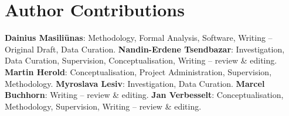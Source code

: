\documentclass[review,authoryear,3p]{elsarticle}
\begin{document}
\section*{Author Contributions}
\textbf{Dainius Masiliūnas}: Methodology, Formal Analysis, Software, Writing – Original Draft, Data Curation. \textbf{Nandin-Erdene Tsendbazar}: Investigation, Data Curation, Supervision, Conceptualisation, Writing – review \& editing. \textbf{Martin Herold}: Conceptualisation, Project Administration, Supervision, Methodology. \textbf{Myroslava Lesiv}: Investigation, Data Curation. \textbf{Marcel Buchhorn}: Writing – review \& editing. \textbf{Jan Verbesselt}: Conceptualisation, Methodology, Supervision, Writing – review \& editing.
\end{document}
